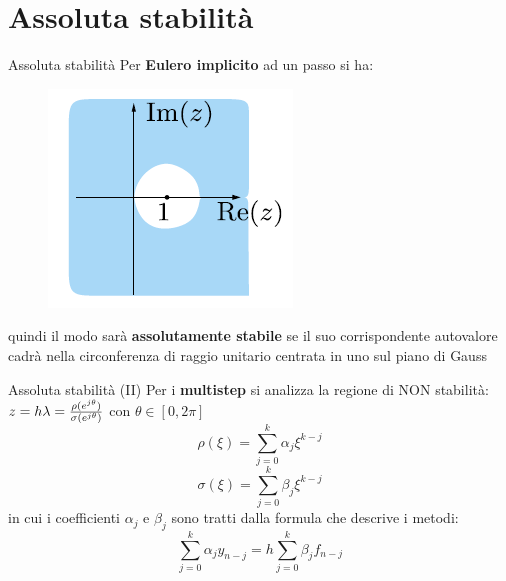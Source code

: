 \documentclass[aspectratio=169, 10pt, handout,usenames,dvipsnames]{beamer}
\begin{document}
\section{Assoluta stabilità}%
    \begin{frame}{Assoluta stabilità}
        Per \textbf{Eulero implicito} ad un passo si ha:
        \begin{figure}
        \centering
        \includegraphics[width=.4\linewidth]{fig6.png}
        \label{fig:my_label}
        \end{figure}
        quindi il modo sarà \textbf{assolutamente stabile} se il suo corrispondente autovalore cadrà nella circonferenza di raggio unitario centrata in uno sul piano di Gauss
    \end{frame}
    
    \begin{frame}{Assoluta stabilità (II)}
        Per i \textbf{multistep} si analizza la regione di NON stabilità: $z= h\lambda = {\rho(e^{j\theta})\over \sigma(e^{j\theta})}$ con $\theta \in [0,2\pi]$
        $$
            \rho(\xi)=\displaystyle\sum_{j=0}^k \alpha_j\xi^{k-j}
        $$
        $$
            \sigma(\xi)=\displaystyle\sum_{j=0}^k \beta_j\xi^{k-j}
        $$
        in cui i coefficienti $\alpha_j$ e $\beta_j$ sono tratti dalla formula che descrive i metodi:
        $$
            \displaystyle\sum_{j=0}^k \alpha_jy_{n-j}=h\displaystyle\sum_{j=0}^k \beta_jf_{n-j}
        $$
    \end{frame}
\end{document}
